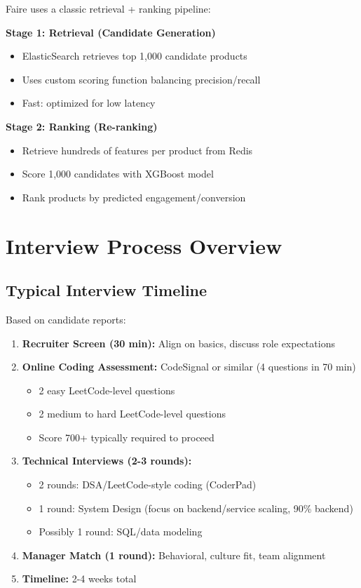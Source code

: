 \documentclass[11pt,letterpaper]{article}
\begin{document}
Faire uses a classic retrieval + ranking pipeline:

\textbf{Stage 1: Retrieval (Candidate Generation)}
\begin{itemize}
    \item ElasticSearch retrieves top 1,000 candidate products
    \item Uses custom scoring function balancing precision/recall
    \item Fast: optimized for low latency
\end{itemize}

\textbf{Stage 2: Ranking (Re-ranking)}
\begin{itemize}
    \item Retrieve hundreds of features per product from Redis
    \item Score 1,000 candidates with XGBoost model
    \item Rank products by predicted engagement/conversion
\end{itemize}

\section{Interview Process Overview}

\subsection{Typical Interview Timeline}

Based on candidate reports:

\begin{enumerate}
    \item \textbf{Recruiter Screen (30 min):} Align on basics, discuss role expectations
    \item \textbf{Online Coding Assessment:} CodeSignal or similar (4 questions in 70 min)
    \begin{itemize}
        \item 2 easy LeetCode-level questions
        \item 2 medium to hard LeetCode-level questions
        \item Score 700+ typically required to proceed
    \end{itemize}
    \item \textbf{Technical Interviews (2-3 rounds):}
    \begin{itemize}
        \item 2 rounds: DSA/LeetCode-style coding (CoderPad)
        \item 1 round: System Design (focus on backend/service scaling, 90\% backend)
        \item Possibly 1 round: SQL/data modeling
    \end{itemize}
    \item \textbf{Manager Match (1 round):} Behavioral, culture fit, team alignment
    \item \textbf{Timeline:} 2-4 weeks total
\end{enumerate}
\end{document}
